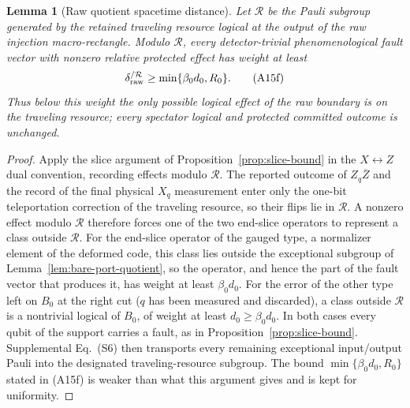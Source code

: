 \documentclass[aps,prx,reprint,superscriptaddress,nofootinbib,floatfix,longbibliography]{revtex4-2}
\newtheorem{lemma}[theorem]{Lemma}
\theoremstyle{definition}
\begin{document}
\begin{lemma}[Raw quotient spacetime distance]\label{lem:raw-quotient-distance}
Let $\mathcal R$ be the Pauli subgroup generated by the retained traveling
resource logical at the output of the raw injection macro-rectangle.  Modulo
$\mathcal R$, every detector-trivial phenomenological fault vector with
nonzero relative protected effect has weight at least
\begin{equation}
 \delta_{\rm raw}^{/\mathcal R}
 \geq\min\{\beta_0d_0,R_0\}.                                     \tag{A15f}
\end{equation}
Thus below this weight the only possible logical effect of the raw boundary is
on the traveling resource; every spectator logical and protected committed
outcome is unchanged.
\end{lemma}
\begin{proof}
Apply the slice argument of Proposition~\ref{prop:slice-bound} in the
$X\leftrightarrow Z$ dual convention, recording effects modulo $\mathcal R$.
The reported outcome of $Z_q\overline Z$ and the record of the final physical
$X_q$ measurement enter only the one-bit teleportation correction of the
traveling resource, so their flips lie in $\mathcal R$.  A nonzero effect
modulo $\mathcal R$ therefore forces one of the two end-slice operators to
represent a class outside $\mathcal R$.  For the end-slice operator of the
gauged type, a normalizer element of the deformed code, this class lies
outside the exceptional subgroup of Lemma~\ref{lem:bare-port-quotient}, so the
operator, and hence the part of the fault vector that produces it, has
weight at least $\beta_0d_0$.  For the error of the other type left on $B_0$
at the right cut ($q$ has been measured and discarded), a class outside
$\mathcal R$ is a nontrivial logical of $B_0$, of weight at least
$d_0\geq\beta_0d_0$.  In both cases every qubit of the support carries a
fault, as in Proposition~\ref{prop:slice-bound}.  Supplemental Eq.~(S6) then
transports every remaining exceptional input/output Pauli into the designated
traveling-resource subgroup.  The bound $\min\{\beta_0d_0,R_0\}$ stated in
(A15f) is weaker than what this argument gives and is kept for uniformity.
\end{proof}
\end{document}
